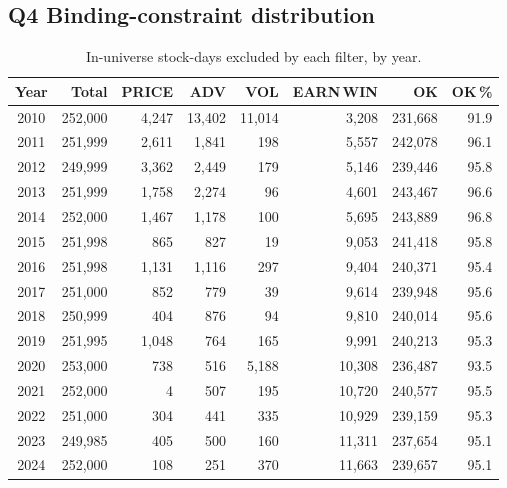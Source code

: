 \documentclass[12pt,a4paper]{article}
\begin{document}
\subsection*{Q4 \quad Binding-constraint distribution}
\label{sec:s2q4}

\begin{table}[H]
\centering
\caption{In-universe stock-days excluded by each filter, by year.}
\label{tab:binding}
\begin{tabular}{crrrrrrr}
\toprule
Year & Total & PRICE & ADV & VOL & EARN\,WIN & OK & OK\,\% \\
\midrule
2010 & 252,000 & 4,247 & 13,402 & 11,014 &  3,208 & 231,668 & 91.9 \\
2011 & 251,999 & 2,611 &  1,841 &    198 &  5,557 & 242,078 & 96.1 \\
2012 & 249,999 & 3,362 &  2,449 &    179 &  5,146 & 239,446 & 95.8 \\
2013 & 251,999 & 1,758 &  2,274 &     96 &  4,601 & 243,467 & 96.6 \\
2014 & 252,000 & 1,467 &  1,178 &    100 &  5,695 & 243,889 & 96.8 \\
2015 & 251,998 &   865 &    827 &     19 &  9,053 & 241,418 & 95.8 \\
2016 & 251,998 & 1,131 &  1,116 &    297 &  9,404 & 240,371 & 95.4 \\
2017 & 251,000 &   852 &    779 &     39 &  9,614 & 239,948 & 95.6 \\
2018 & 250,999 &   404 &    876 &     94 &  9,810 & 240,014 & 95.6 \\
2019 & 251,995 & 1,048 &    764 &    165 &  9,991 & 240,213 & 95.3 \\
2020 & 253,000 &   738 &    516 &  5,188 & 10,308 & 236,487 & 93.5 \\
2021 & 252,000 &     4 &    507 &    195 & 10,720 & 240,577 & 95.5 \\
2022 & 251,000 &   304 &    441 &    335 & 10,929 & 239,159 & 95.3 \\
2023 & 249,985 &   405 &    500 &    160 & 11,311 & 237,654 & 95.1 \\
2024 & 252,000 &   108 &    251 &    370 & 11,663 & 239,657 & 95.1 \\
\bottomrule
\end{tabular}
\end{table}
\end{document}
